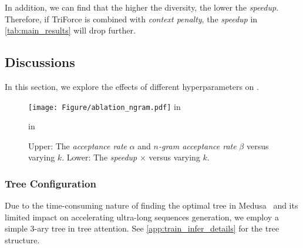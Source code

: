 In addition, we can find that the higher the diversity, the lower the \emph{speedup}. Therefore, if TriForce is combined with \textit{context penalty}, the \emph{speedup} in \cref{tab:main_results} will drop further.

\subsection{Discussions}
In this section, we explore the effects of different hyperparameters on \ours.

\begin{figure}[t!]
    \centering
    \texttt{[image: Figure/ablation\_ngram.pdf]}
     in
    \caption{Upper: The \emph{acceptance rate} $\alpha$ and \emph{$n$-gram acceptance rate} $\beta$ versus varying $k$. Lower: The \emph{speedup} $\times$ versus varying $k$.}
    \label{fig:ablation_ngram}
     in
\end{figure}

\begin{table}[t!]
    \centering
\begin{minipage}[t]{.48\textwidth}

\end{minipage}\hfill
\begin{minipage}[t]{.48\textwidth}

\end{minipage}
\end{table}

\subsubsection{Tree Configuration}
Due to the time-consuming nature of finding the optimal tree in Medusa~\citep{medusa} and its limited impact on accelerating ultra-long sequences generation, we employ a simple 3-ary tree in tree attention. See \cref{app:train_infer_details} for the tree structure.




